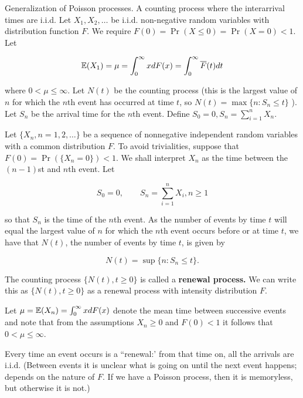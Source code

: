 Generalization of Poisson processes. A counting process where the interarrival times are i.i.d. Let \(X_1, X_2, \ldots\) be i.i.d. non-negative random variables with distribution function \(F\). We require \(F(0) = \Pr(X \leq 0) = \Pr(X=0) < 1\). Let

\[
\E(X_1) = \mu= \int_0^\infty x dF(x) = \int_0^\infty \overline{F}(t) dt
\]

where \(0 < \mu \leq \infty\). Let \(N(t)\) be the counting process (this is the largest value of \(n\) for which the \(n\)th event has occurred at time \(t\), so \(N(t) = \max \{n: S_n \leq t\}\) ). Let \(S_n\) be the arrival time for the \(n\)th event. Define \(S_0 = 0, S_n = \sum_{i=1}^n X_n\). 

\begin{definition} Let \(\{X_n, n =1, 2, \ldots \}\) be a sequence of nonnegative independent random variables with a common distribution \(F\). To avoid trivialities, suppose that \(F(0) = \Pr(\{X_n = 0 \}) < 1\). We shall interpret \(X_n\) as the time between the \((n-1)\)st and \(n\)th event. Let

\[
S_0 = 0, \qquad S_n = \sum_{i=1}^n X_i, n \geq 1
\]

so that \(S_n\) is the time of the \(n\)th event. As the number of events by time \(t\) will equal the largest value of \(n\) for which the \(n\)th event occurs before or at time \(t\), we have that \(N(t)\), the number of events by time \(t\), is given by

\[
N(t) = \sup \{n: S_n \leq t\}.
\]

The counting process \(\{N(t), t \geq 0\}\) is called a \textbf{renewal process.} We can write this as \(\{N(t), t \geq 0 \}\) as a renewal process with intensity distribution \(F\).

\end{definition}

\begin{remark} Let \(\mu = \E(X_n) = \int_0^\infty x dF(x)\) denote the mean time between successive events and note that from the assumptions \(X_n \geq 0\) and \(F(0) < 1\) it follows that \(0 < \mu \leq \infty\).

\end{remark}

Every time an event occurs is a ``renewal:' from that time on, all the arrivals are i.i.d. (Between events it is unclear what is going on until the next event happens; depends on the nature of \(F\). If we have a Poisson process, then it is memoryless, but otherwise it is not.)

